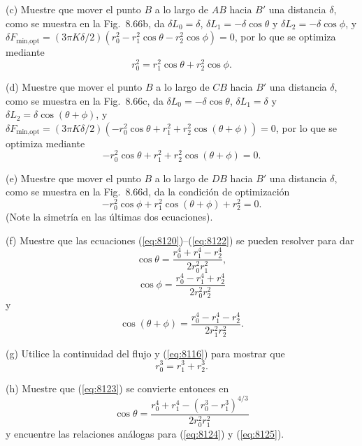 \documentclass[12pt]{book}
\begin{document}
(c) Muestre que mover el punto $B$ a lo largo de $AB$ hacia $B'$ una distancia $\delta$, como se muestra en la Fig.~8.66b, da $\delta L_0 = \delta$, $\delta L_1 = -\delta \cos \theta$ y $\delta L_2 = -\delta \cos \phi$, y $\delta F_{\text{min,opt}} = (3\pi K\delta/2)(r_0^2 - r_1^2 \cos \theta - r_2^2 \cos \phi) = 0$, por lo que se optimiza mediante
\begin{equation}
r_0^2 = r_1^2 \cos \theta + r_2^2 \cos \phi.
\label{eq:8120}
\end{equation}

(d) Muestre que mover el punto $B$ a lo largo de $CB$ hacia $B'$ una distancia $\delta$, como se muestra en la Fig.~8.66c, da $\delta L_0 = -\delta \cos \theta$, $\delta L_1 = \delta$ y $\delta L_2 = \delta \cos(\theta + \phi)$, y $\delta F_{\text{min,opt}} = (3\pi K\delta/2)(-r_0^2 \cos \theta + r_1^2 + r_2^2 \cos(\theta + \phi)) = 0$, por lo que se optimiza mediante
\begin{equation}
-r_0^2 \cos \theta + r_1^2 + r_2^2 \cos(\theta + \phi) = 0.
\label{eq:8121}
\end{equation}

(e) Muestre que mover el punto $B$ a lo largo de $DB$ hacia $B'$ una distancia $\delta$, como se muestra en la Fig.~8.66d, da la condición de optimización
\begin{equation}
-r_0^2 \cos \phi + r_1^2 \cos(\theta + \phi) + r_2^2 = 0.
\label{eq:8122}
\end{equation}
(Note la simetría en las últimas dos ecuaciones).

(f) Muestre que las ecuaciones (\ref{eq:8120})--(\ref{eq:8122}) se pueden resolver para dar
\begin{equation}
\cos\theta = \frac{r_0^4 + r_1^4 - r_2^4}{2 r_0^2 r_1^2},
\label{eq:8123}
\end{equation}
\begin{equation}
\cos\phi = \frac{r_0^4 - r_1^4 + r_2^4}{2 r_0^2 r_2^2}
\label{eq:8124}
\end{equation}
y
\begin{equation}
\cos(\theta + \phi) = \frac{r_0^4 - r_1^4 - r_2^4}{2 r_1^2 r_2^2}.
\label{eq:8125}
\end{equation}

(g) Utilice la continuidad del flujo y (\ref{eq:8116}) para mostrar que
\begin{equation}
r_0^3 = r_1^3 + r_2^3.
\label{eq:8126}
\end{equation}

(h) Muestre que (\ref{eq:8123}) se convierte entonces en
\begin{equation}
\cos\theta = \frac{r_0^4 + r_1^4 - (r_0^3 - r_1^3)^{4/3}}{2 r_0^2 r_1^2}
\label{eq:8127}
\end{equation}
y encuentre las relaciones análogas para (\ref{eq:8124}) y (\ref{eq:8125}).
\end{document}
